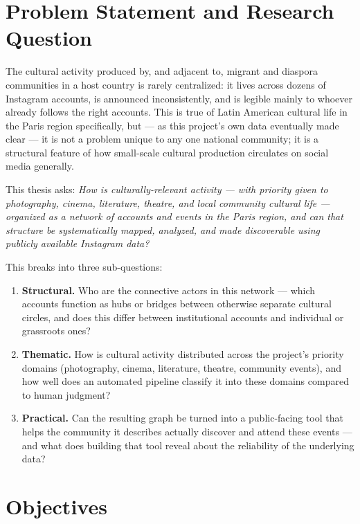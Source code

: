 \documentclass[12pt, a4paper]{report}
\begin{document}
\section{Problem Statement and Research Question}
\label{sec:research-question}

The cultural activity produced by, and adjacent to, migrant and diaspora
communities in a host country is rarely centralized: it lives across
dozens of Instagram accounts, is announced inconsistently, and is legible
mainly to whoever already follows the right accounts. This is true of
Latin American cultural life in the Paris region specifically, but — as
this project's own data eventually made clear — it is not a problem
unique to any one national community; it is a structural feature of how
small-scale cultural production circulates on social media generally.

This thesis asks: \emph{How is culturally-relevant activity — with
priority given to photography, cinema, literature, theatre, and local
community cultural life — organized as a network of accounts and events
in the Paris region, and can that structure be systematically mapped,
analyzed, and made discoverable using publicly available Instagram
data?}

This breaks into three sub-questions:
\begin{enumerate}
    \item \textbf{Structural.} Who are the connective actors in this
    network — which accounts function as hubs or bridges between
    otherwise separate cultural circles, and does this differ between
    institutional accounts and individual or grassroots ones?
    \item \textbf{Thematic.} How is cultural activity distributed across
    the project's priority domains (photography, cinema, literature,
    theatre, community events), and how well does an automated pipeline
    classify it into these domains compared to human judgment?
    \item \textbf{Practical.} Can the resulting graph be turned into a
    public-facing tool that helps the community it describes actually
    discover and attend these events — and what does building that tool
    reveal about the reliability of the underlying data?
\end{enumerate}

\section{Objectives}
\label{sec:objectives}
\end{document}
